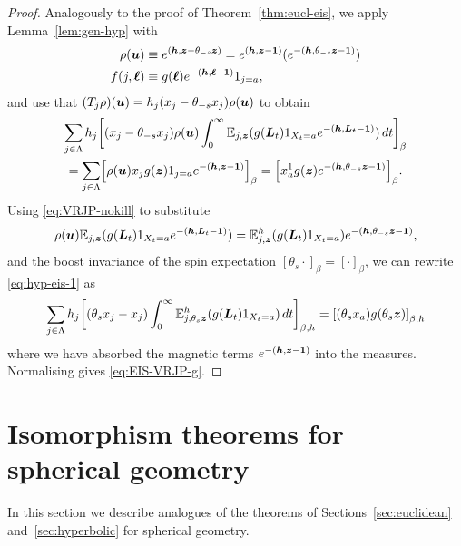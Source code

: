 \documentclass[11pt,a4paper]{article}
\begin{document}
\begin{proof}
  Analogously to the proof of Theorem~\ref{thm:eucl-eis}, we apply
  Lemma~\ref{lem:gen-hyp} with
  \begin{align}
      \rho(\boldsymbol{u}) 
      &\equiv e^{(\boldsymbol{h},\boldsymbol{z}-\theta_{-s}\boldsymbol{z})} = e^{(\boldsymbol{h},\boldsymbol{z}-\boldsymbol{1})}(e^{-(\boldsymbol{h},\theta_{-s}\boldsymbol{z}-\boldsymbol{1})})\\
      f(j,\boldsymbol{\ell}) &\equiv g(\boldsymbol{\ell})e^{-(\boldsymbol{h},\boldsymbol{\ell}-\boldsymbol{1})} 1_{j=a},
  \end{align}
  and use that $(T_j\rho)(\boldsymbol{u}) = h_j(x_j - \theta_{-s}x_j) \rho(\boldsymbol{u})$ to obtain
  \begin{multline}
    \label{eq:hyp-eis-1}
    \sum_{j\in\Lambda} h_j\uspin{(x_j - \theta_{-s}x_j) \rho(\V{u})\int_0^\infty
    \E_{j,\V{z}}(
    g(\V{L}_t)1_{X_{t}=a}e^{-(\V{h},\V{L_t}-\V{1})})\,dt}_{\beta}
    \\
    =
      \sum_{j\in\Lambda}\uspin{\rho(\V{u})x_{j} 
    g(\V{z})1_{j=a}e^{-(\V{h},\V{z}-\V{1})}}_{\beta}
    = 
      \uspin{x_{a}^{1} 
      g(\V{z})e^{-(\V{h},\theta_{-s}\V{z}-\V{1})}}_{\beta}.
  \end{multline}
  Using \eqref{eq:VRJP-nokill} to substitute
  \begin{equation}
    \rho(\boldsymbol{u})\mathbb{E}_{j,\boldsymbol{z}}(
    g(\boldsymbol{L}_t)1_{X_{t}=a}e^{-(\boldsymbol{h},\boldsymbol{L}_t-\boldsymbol{1})}) 
    = \mathbb{E}_{j,\boldsymbol{z}}^h(
    g(\boldsymbol{L}_t)1_{X_{t}=a})e^{-(\boldsymbol{h},\theta_{-s}\boldsymbol{z}-\boldsymbol{1})},
  \end{equation}
  and the boost invariance of the spin expectation
  $[\theta_s\cdot]_\beta = [\cdot]_\beta$, we can rewrite
  \eqref{eq:hyp-eis-1} as
  \begin{equation}
    \sum_{j\in\Lambda}h_j\uspin{(\theta_sx_j - x_j) \int_0^\infty
      \E_{j,\theta_s\V{z}}^h(g(\V{L}_t)1_{X_{t}=a})\,dt}_{\beta,h} 
    = 
    \uspin{(\theta_s x_a) g(\theta_s \V{z})}_{\beta,h}
  \end{equation}
  where we have absorbed the magnetic
  terms $e^{-(\boldsymbol{h},\boldsymbol{z}-\boldsymbol{1})}$ into the measures.
  Normalising gives \eqref{eq:EIS-VRJP-g}. 
\end{proof} 


\section{Isomorphism theorems for spherical geometry}
\label{sec:spherical}

In this section we describe analogues of the theorems of
Sections~\ref{sec:euclidean} and~\ref{sec:hyperbolic} for spherical
geometry.
\end{document}
